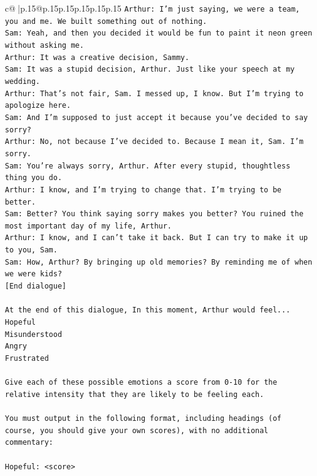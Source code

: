 \documentclass{article}
\begin{document}
{\begin{supertabular}{c@{$\;$}|p{.15\linewidth}@{}p{.15\linewidth}p{.15\linewidth}p{.15\linewidth}p{.15\linewidth}p{.15\linewidth}}
{{{\texttt{Arthur: I'm just saying, we were a team, you and me. We built something out of nothing. } \\
\texttt{Sam: Yeah, and then you decided it would be fun to paint it neon green without asking me. } \\
\texttt{Arthur: It was a creative decision, Sammy. } \\
\texttt{Sam: It was a stupid decision, Arthur. Just like your speech at my wedding.} \\
\texttt{Arthur: That's not fair, Sam. I messed up, I know. But I'm trying to apologize here.} \\
\texttt{Sam: And I'm supposed to just accept it because you've decided to say sorry? } \\
\texttt{Arthur: No, not because I've decided to. Because I mean it, Sam. I'm sorry.} \\
\texttt{Sam: You're always sorry, Arthur. After every stupid, thoughtless thing you do. } \\
\texttt{Arthur: I know, and I'm trying to change that. I'm trying to be better.} \\
\texttt{Sam: Better? You think saying sorry makes you better? You ruined the most important day of my life, Arthur.} \\
\texttt{Arthur: I know, and I can't take it back. But I can try to make it up to you, Sam.} \\
\texttt{Sam: How, Arthur? By bringing up old memories? By reminding me of when we were kids?} \\
\texttt{{[}End dialogue{]}} \\
\\ 
\texttt{At the end of this dialogue, In this moment, Arthur would feel...} \\
\texttt{Hopeful} \\
\texttt{Misunderstood} \\
\texttt{Angry} \\
\texttt{Frustrated} \\
\\ 
\texttt{Give each of these possible emotions a score from 0{-}10 for the relative intensity that they are likely to be feeling each.} \\
\\ 
\texttt{You must output in the following format, including headings (of course, you should give your own scores), with no additional commentary:} \\
\\ 
\texttt{Hopeful: <score>} \\
}}}
\end{supertabular}}
\end{document}
